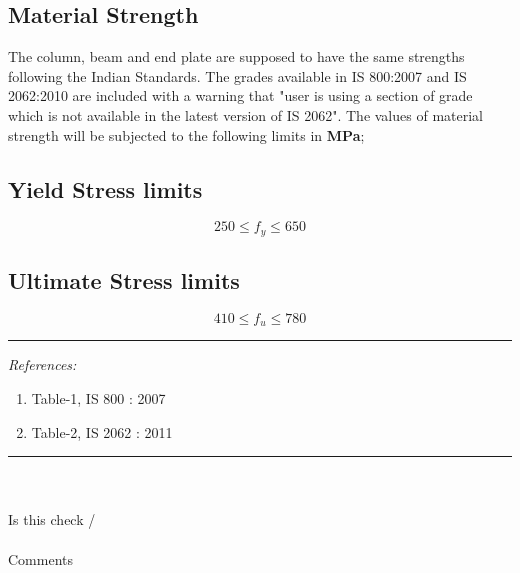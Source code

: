 \documentclass[11.5pt,a4paper,oneside]{report}
\newcommand{\okornot}{ \vspace{15mm} \hrule
	\noindent \\ \\
	Is this check \qquad
	\CheckBox[checked=False, name= ok]{\textbf{Ok}} \qquad / 
	\CheckBox[checked=False, name= notok]{\textbf{Not Ok}}\\ \\
	Comments \\ \\
	\noindent
	\TextField[name=multilinetextbox, multiline=true, width=1.0\linewidth,height=2in]{}}
\newcommand{\checkrefernces} {
	\vspace{15mm} \hrule \vspace{2mm}
	\textit{References:}}
\begin{document}
\begin{Form}
\chapter{Material Strength}
%
The column, beam and end plate are supposed to have the same strengths following the Indian Standards. The grades available in IS 800:2007 and IS 2062:2010 are included with a warning that "user is using a section of grade which is not available in the latest version of IS 2062". The values of material strength will be subjected to the following limits in \textbf{MPa};
	\section{Yield Stress limits}
	\begin{equation}
	250 \leq f_{y} \leq 650
	\end{equation}
	\section{Ultimate Stress limits}
	\begin{equation}
	410 \leq f_{u} \leq 780
	\end{equation}
	
	\checkrefernces
		\begin{enumerate}
			\item Table-1, IS 800 : 2007
			\item Table-2, IS 2062 : 2011
		\end{enumerate}
	\okornot

\end{Form}
\end{document}
